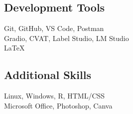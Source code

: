 \documentclass[a4paper]{deedy-resume}
\begin{document}
\begin{minipage}[t]{0.33\textwidth}
\subsection*{Development Tools}
Git, GitHub, VS Code, Postman \\
Gradio, CVAT, Label Studio, LM Studio \\
\LaTeX \\

\subsection*{Additional Skills}
Linux, Windows, R, HTML/CSS \\
Microsoft Office, Photoshop, Canva \\

\end{minipage}

\newpage

\end{document}
